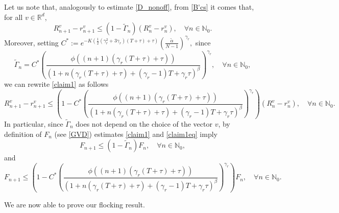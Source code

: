 \documentclass[11pt]{article}
\begin{document}
	
	\begin{oss}
		Let us note that, analogously to estimate \eqref{D_nonoff}, from \eqref{B'cs} it comes that, for all $v\in\mathbb{R}^d$,
		\begin{equation}\label{claim1}
			R_{n+1}^v-r_{n+1}^v\leq (1-\tilde\Gamma_{n})(R_{n}^v-r_{n}^v),\quad\forall n\in \mathbb{N}_0.
		\end{equation}
		Moreover, setting $C^*:=e^{-K (\frac{1}{2}(\gamma_r^2+3\gamma_r)(T+\tau)+\tau)}\left(\frac{\tilde{\alpha}}{N-1}\right)^{\gamma_r},$ since
		\begin{equation}\label{gammaneq}
			\tilde\Gamma_{n}=C^*\left(\frac{\phi((n+1)(\gamma_r(T+\tau)+\tau))}{(1+n(\gamma_r(T+\tau)+\tau)+(\gamma_r-1)T+\gamma_r\tau)^\beta}\right)^{\gamma_r},\quad \forall n\in\mathbb{N}_0,
		\end{equation}
	we can rewrite \eqref{claim1} as follows
	\begin{equation}\label{claim1eq}
		R_{n+1}^v-r_{n+1}^v\leq \left(1-C^*\left(\frac{\phi((n+1)(\gamma_r(T+\tau)+\tau))}{(1+n(\gamma_r(T+\tau)+\tau)+(\gamma_r-1)T+\gamma_r\tau)^\beta}\right)^{\gamma_r}\right)(R_{n}^v-r_{n}^v),\quad\forall n\in \mathbb{N}_0.
	\end{equation}
In particular, since $\tilde{\Gamma}_n$ does not depend on the choice of the vector $v$, by definition of $F_n$ (see \eqref{GVD}) estimates \eqref{claim1} and \eqref{claim1eq} imply
\begin{equation}\label{F_n}
	F_{n+1}\leq (1-\tilde\Gamma_{n})F_n,\quad \forall n\in \mathbb{N}_0,
\end{equation}
and
\begin{equation}\label{F_neq}
	F_{n+1}\leq \left(1-C^*\left(\frac{\phi((n+1)(\gamma_r(T+\tau)+\tau))}{(1+n(\gamma_r(T+\tau)+\tau)+(\gamma_r-1)T+\gamma_r\tau)^\beta}\right)^{\gamma_r}\right)F_n,\quad \forall n\in \mathbb{N}_0.
\end{equation}
	\end{oss} 
    We are now able to prove our flocking result.
\end{document}
